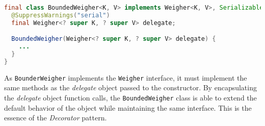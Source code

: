 \begin{lstlisting}[language=Java, caption={\texttt{BoundedWeigher} final class decorating a \texttt{Weigher} instance}, captionpos=b]
final class BoundedWeigher<K, V> implements Weigher<K, V>, Serializable {
  @SuppressWarnings("serial")
  final Weigher<? super K, ? super V> delegate;

  BoundedWeigher(Weigher<? super K, ? super V> delegate) {
    ...
  }
}

\end{lstlisting}

\noindent As \texttt{BounderWeigher} implements the \texttt{Weigher} interface, it must implement the same methods as the \textit{delegate} object passed to the constructor. By encapsulating the \textit{delegate} object function calls, the \texttt{BoundedWeigher} class is able to extend the default behavior of the object while maintaining the same interface. This is the essence of the \textit{Decorator} pattern.


